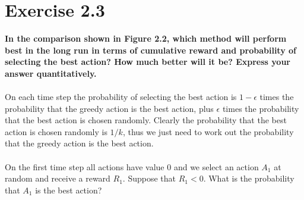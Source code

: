 \documentclass[a4paper,11pt]{article}
\numberwithin{equation}{section}
\theoremstyle{remark}
\begin{document}
\section{Exercise 2.3}

\textbf{In the comparison shown in Figure 2.2, which method will perform best in the long run in terms of cumulative reward and probability of selecting the best action? How much better will it be? Express your answer quantitatively.}
\\ \\ 
On each time step the probability of selecting the best action is $1-\epsilon$ times the probability that the greedy action is the best action, plus $\epsilon$ times the probability that the best action is chosen randomly. Clearly the probability that the best action is chosen randomly is $1/k$, thus we just need to work out the probability that the greedy action is the best action. 
\\ \\ 
On the first time step all actions have value 0 and we select an action $A_1$ at random and receive a reward $R_1$. Suppose that $R_1 < 0$. What is the probability that $A_1$ is the best action? 
\end{document}
